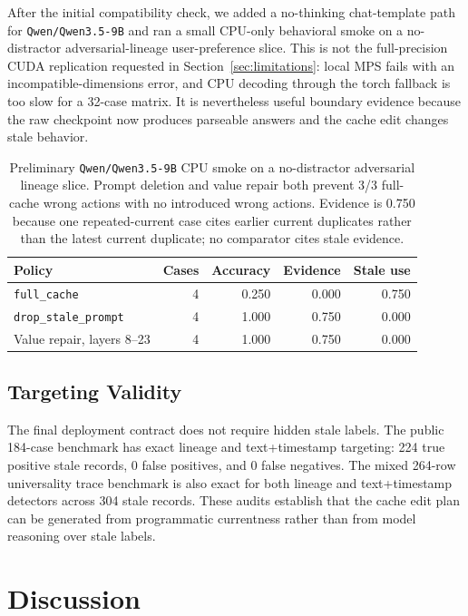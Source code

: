 \documentclass[11pt]{article}
\newcommand{\fullcache}{\texttt{full\_cache}}
\newcommand{\promptdelete}{\texttt{drop\_stale\_prompt}}
\newcommand{\qwenmodel}{\texttt{Qwen/Qwen3.5-9B}}
\begin{document}
After the initial compatibility check, we added a no-thinking chat-template
path for \qwenmodel{} and ran a small CPU-only behavioral smoke on a
no-distractor adversarial-lineage user-preference slice. This is not the
full-precision CUDA replication requested in Section~\ref{sec:limitations}:
local MPS fails with an incompatible-dimensions error, and CPU decoding through
the torch fallback is too slow for a 32-case matrix. It is nevertheless useful
boundary evidence because the raw checkpoint now produces parseable answers and
the cache edit changes stale behavior.

\begin{table}[H]
\centering
\small
\begin{tabular}{lrrrr}
\toprule
\textbf{Policy} & \textbf{Cases} & \textbf{Accuracy} & \textbf{Evidence} & \textbf{Stale use} \\
\midrule
\fullcache & 4 & 0.250 & 0.000 & 0.750 \\
\promptdelete & 4 & 1.000 & 0.750 & 0.000 \\
Value repair, layers 8--23 & 4 & 1.000 & 0.750 & 0.000 \\
\bottomrule
\end{tabular}
\caption{Preliminary \qwenmodel{} CPU smoke on a no-distractor adversarial
lineage slice. Prompt deletion and value repair both prevent 3/3 full-cache
wrong actions with no introduced wrong actions. Evidence is 0.750 because one
repeated-current case cites earlier current duplicates rather than the latest
current duplicate; no comparator cites stale evidence.}
\label{tab:qwen35-smoke}
\end{table}

\subsection{Targeting Validity}

The final deployment contract does not require hidden stale labels. The public
184-case benchmark has exact lineage and text+timestamp targeting: 224 true
positive stale records, 0 false positives, and 0 false negatives. The mixed
264-row universality trace benchmark is also exact for both lineage and
text+timestamp detectors across 304 stale records. These audits establish that
the cache edit plan can be generated from programmatic currentness rather than
from model reasoning over stale labels.

\section{Discussion}
\end{document}

